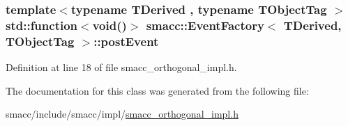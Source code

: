 \subsubsection[{\texorpdfstring{post\+Event}{postEvent}}]{\setlength{\rightskip}{0pt plus 5cm}template$<$typename T\+Derived , typename T\+Object\+Tag $>$ std\+::function$<$void()$>$ {\bf smacc\+::\+Event\+Factory}$<$ T\+Derived, T\+Object\+Tag $>$\+::post\+Event\hspace{0.3cm}{\ttfamily [private]}}\hypertarget{classsmacc_1_1EventFactory_ac0b34b9a502aca2c5614f0d45c0a9a58}{}\label{classsmacc_1_1EventFactory_ac0b34b9a502aca2c5614f0d45c0a9a58}


Definition at line 18 of file smacc\+\_\+orthogonal\+\_\+impl.\+h.



The documentation for this class was generated from the following file\+:\begin{DoxyCompactItemize}
\item 
smacc/include/smacc/impl/\hyperlink{smacc__orthogonal__impl_8h}{smacc\+\_\+orthogonal\+\_\+impl.\+h}\end{DoxyCompactItemize}
